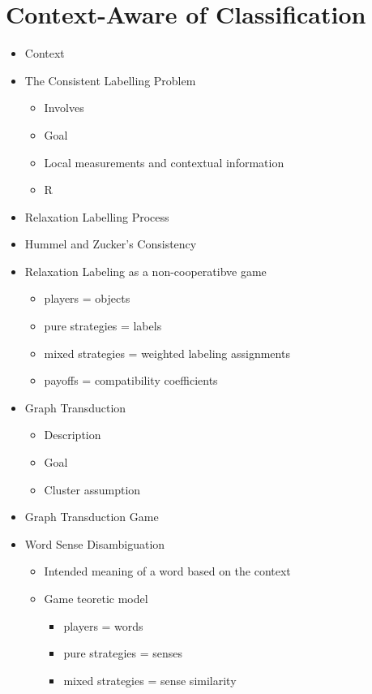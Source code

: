 \documentclass[12pt,oneside]{report}
\begin{document}
\section{Context-Aware of Classification}
\begin{itemize}
    \item Context
    \item The Consistent Labelling Problem
    \begin{itemize}
        \item Involves
        \item Goal
        \item Local measurements and contextual information
        \item R
    \end{itemize}
    \item Relaxation Labelling Process
    \item Hummel and Zucker's Consistency
    \item Relaxation Labeling as a non-cooperatibve game
    \begin{itemize}
        \item players = objects
        \item pure strategies = labels
        \item mixed strategies = weighted labeling assignments
        \item payoffs = compatibility coefficients
    \end{itemize}
    \item Graph Transduction
    \begin{itemize}
        \item Description
        \item Goal
        \item Cluster assumption
    \end{itemize}
    \item Graph Transduction Game
    \item Word Sense Disambiguation
    \begin{itemize}
        \item Intended meaning of a word based on the context
        \item Game teoretic model
        \begin{itemize}
            \item players = words
            \item pure strategies = senses
            \item mixed strategies = sense similarity

\end{itemize}
\end{itemize}
\end{itemize}
\end{document}
